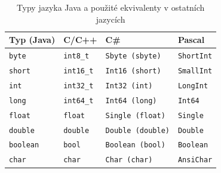 \documentclass[onepage, a4paper, 12pt]{bakalarka}
\begin{document}
\begin{table}\centering
\caption{Typy jazyka Java a použité ekvivalenty v ostatních jazycích}
\begin{tabular}{| l | l | l | l |}
\hline
\textbf{Typ (Java)} & \textbf{C/C++} & \textbf{C\#} & \textbf{Pascal} \\ \hline
\texttt{byte} & \texttt{int8\_t} & \texttt{Sbyte (sbyte)} & \texttt{ShortInt} \\ \hline
\texttt{short} & \texttt{int16\_t} & \texttt{Int16 (short)} & \texttt{SmallInt} \\ \hline
\texttt{int} & \texttt{int32\_t} & \texttt{Int32 (int)} & \texttt{LongInt} \\ \hline
\texttt{long} & \texttt{int64\_t} & \texttt{Int64 (long)} & \texttt{Int64} \\ \hline
\texttt{float} & \texttt{float} & \texttt{Single (float)} & \texttt{Single} \\ \hline
\texttt{double} & \texttt{double} & \texttt{Double (double)} & \texttt{Double} \\ \hline
\texttt{boolean} & \texttt{bool} & \texttt{Boolean (bool)} & \texttt{Boolean} \\ \hline
\texttt{char} & \texttt{char} & \texttt{Char (char)} & \texttt{AnsiChar} \\ \hline
\end{tabular}
\label{table:types-summary}
\end{table}
\end{document}
